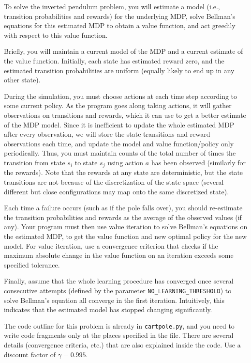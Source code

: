 \documentclass{article}
\begin{document}
To solve the inverted pendulum problem, you will estimate a model (i.e., transition probabilities and rewards) for the underlying MDP, solve Bellman’s equations for this estimated MDP to obtain a value function, and act greedily with respect to this value function.

Briefly, you will maintain a current model of the MDP and a current estimate of the value function. Initially, each state has estimated reward zero, and the estimated transition probabilities are uniform (equally likely to end up in any other state).

During the simulation, you must choose actions at each time step according to some current policy. As the program goes along taking actions, it will gather observations on transitions and rewards, which it can use to get a better estimate of the MDP model. Since it is inefficient to update the whole estimated MDP after every observation, we will store the state transitions and reward observations each time, and update the model and value function/policy only periodically. Thus, you must maintain counts of the total number of times the transition from state \(s_i\) to state \(s_j\) using action \(a\) has been observed (similarly for the rewards). Note that the rewards at any state are deterministic, but the state transitions are not because of the discretization of the state space (several different but close configurations may map onto the same discretized state).

Each time a failure occurs (such as if the pole falls over), you should re-estimate the transition probabilities and rewards as the average of the observed values (if any). Your program must then use value iteration to solve Bellman’s equations on the estimated MDP, to get the value function and new optimal policy for the new model. For value iteration, use a convergence criterion that checks if the maximum absolute change in the value function on an iteration exceeds some specified tolerance.

Finally, assume that the whole learning procedure has converged once several consecutive attempts (defined by the parameter \texttt{NO\_LEARNING\_THRESHOLD}) to solve Bellman’s equation all converge in the first iteration. Intuitively, this indicates that the estimated model has stopped changing significantly.

The code outline for this problem is already in \texttt{cartpole.py}, and you need to write code fragments only at the places specified in the file. There are several details (convergence criteria, etc.) that are also explained inside the code. Use a discount factor of \(\gamma = 0.995\).
\end{document}
